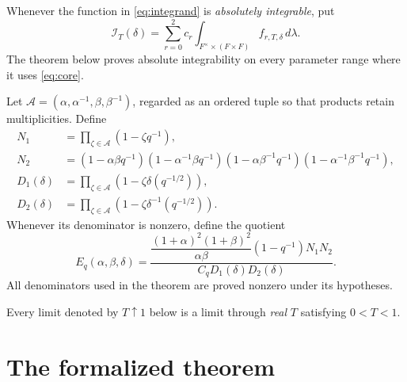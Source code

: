 \documentclass[11pt,a4paper]{article}
\newcommand{\I}{\mathcal I}
\newcommand{\E}{E_q}
\begin{document}
Whenever the  function in \eqref{eq:integrand} is \emph{absolutely integrable}, put
\begin{equation}\label{eq:core}
 \I_T(\delta)=\sum_{r=0}^{2}c_r
 \int_{F^\times\times(F\times F)} f_{r,T,\delta}\,d\lambda.
\end{equation}
The theorem below proves absolute integrability on
every parameter range where it uses \eqref{eq:core}.

Let $\mathcal A=(\alpha,\alpha^{-1},\beta,\beta^{-1})$, regarded as an
ordered tuple so that products retain multiplicities. Define
\begin{align}
 N_1&=\prod_{\zeta\in\mathcal A}(1-\zeta q^{-1}),\label{eq:N1}\\
 N_2&=(1-\alpha\beta q^{-1})(1-\alpha^{-1}\beta q^{-1})
 (1-\alpha\beta^{-1}q^{-1})(1-\alpha^{-1}\beta^{-1}q^{-1}),\label{eq:N2}\\
 D_1(\delta)&=\prod_{\zeta\in\mathcal A}(1-\zeta\delta (q^{-1/2})),\label{eq:D1}\\
 D_2(\delta)&=\prod_{\zeta\in\mathcal A}(1-\zeta\delta^{-1}(q^{-1/2})).\label{eq:D2}
\end{align}
Whenever its denominator is nonzero, define the quotient
\begin{equation}\label{eq:E}
 \boxed{\displaystyle
 \E(\alpha,\beta,\delta)=
 \frac{\dfrac{(1+\alpha)^2(1+\beta)^2}{\alpha\beta}
       (1-q^{-1})N_1N_2}
      {C_qD_1(\delta)D_2(\delta)}.}
\end{equation}
All denominators used in the theorem are proved nonzero under its hypotheses.

Every limit denoted by $T\uparrow1$ below is a limit through
\emph{real} $T$ satisfying $0<T<1$. 

\clearpage
\section{The formalized theorem}
\end{document}
